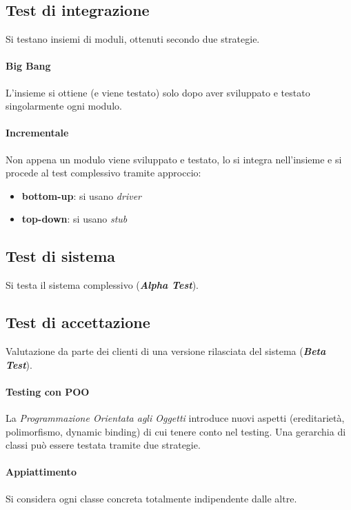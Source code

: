\subsection{Test di integrazione}
Si testano insiemi di moduli, ottenuti secondo due strategie.

\paragraph{Big Bang} L'insieme si ottiene (e viene testato) solo dopo aver sviluppato e testato singolarmente ogni modulo.

\paragraph{Incrementale} Non appena un modulo viene sviluppato e testato, lo si integra nell'insieme e si procede al test complessivo tramite approccio:
\begin{itemize}
    \item \textbf{bottom-up}: si usano \textit{driver}
    \item \textbf{top-down}: si usano \textit{stub}
\end{itemize}

\subsection{Test di sistema} Si testa il sistema complessivo (\textbf{\textit{Alpha Test}}).

\subsection{Test di accettazione} Valutazione da parte dei clienti di una versione rilasciata del sistema (\textbf{\textit{Beta Test}}).

\newpage
\paragraph{Testing con POO}

La \textit{Programmazione Orientata agli Oggetti} introduce nuovi aspetti (ereditarietà, polimorfismo, dynamic binding) di cui tenere conto nel testing. Una gerarchia di classi può essere testata tramite due strategie.

\paragraph{Appiattimento}  Si considera ogni classe concreta totalmente indipendente dalle altre.

